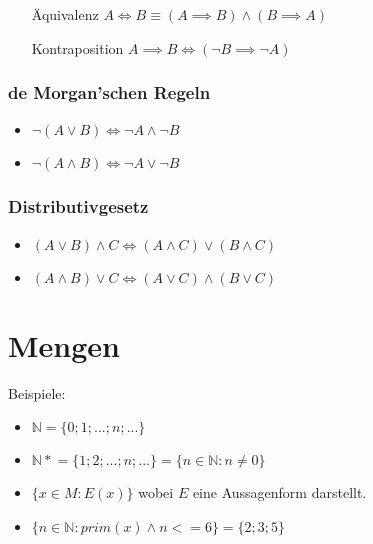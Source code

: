 \documentclass[12pt]{scrreprt}
\begin{document}
                \begin{itemize}
                    \item[Äquivalenz] $ A \iff B \equiv (A \implies B) \land (B \implies A) $
                    \item[Kontraposition] $ A \implies B \iff (\lnot B \implies \lnot A) $
                \end{itemize}


                \subsubsection{de Morgan'schen Regeln}
                    \label{sss:grundbegriffe_aussagen_verknuepfungen_deMorgan}

                    \begin{itemize}
                        \item $ \lnot (A \lor B) \iff \lnot A \land \lnot B $
                        \item $ \lnot (A \land B) \iff \lnot A \lor \lnot B $
                    \end{itemize}


                \subsubsection{Distributivgesetz}
                    \label{sss:grundbegriffe_aussagen_verknuepfungen_distributivgesetz}

                    \begin{itemize}
                        \item $ (A \lor B) \land C \iff (A \land C) \lor (B \land C) $
                        \item $ (A \land B) \lor C \iff (A \lor C) \land (B \lor C) $
                    \end{itemize}



        \section{Mengen}
            \label{s:grundbegriffe_mengen}

            Beispiele:
            \begin{itemize}
                \item $ \mathbb{N} = \{ 0; 1; ...; n; ... \} $
                \item $ \mathbb{N*} = \{ 1; 2; ...; n; ... \} = \{ n \in \mathbb{N} : n \neq 0 \} $
                \item $ \{ x \in M : E(x) \} $ wobei $ E $ eine Aussagenform darstellt.
                \item $ \{ n \in \mathbb{N} : prim(x) \land n <= 6 \} = \{ 2; 3; 5 \} $
            \end{itemize}
\end{document}
